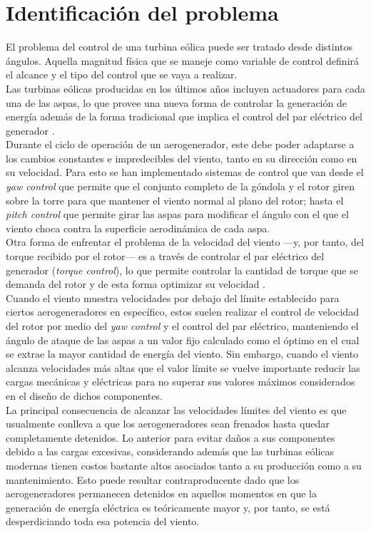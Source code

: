 \section{Identificación del problema}
{\parindent0pt
El problema del control de una turbina eólica puede ser tratado desde distintos ángulos. 
Aquella magnitud física que se maneje como variable de control definirá el alcance y el tipo 
del control que se vaya a realizar. 
\\

Las turbinas eólicas producidas en los últimos años incluyen actuadores para cada una de 
las aspas, lo que provee una nueva forma de controlar la generación de energía además de 
la forma tradicional que implica el control del par eléctrico del generador \cite{Laks2009}.
\\

Durante el ciclo de operación de un aerogenerador, este debe poder adaptarse a los cambios 
constantes e impredecibles del viento, tanto en su dirección como en su velocidad. Para esto 
se han implementado sistemas de control que van desde el \emph{yaw control} que permite que 
el conjunto completo de la góndola y el rotor giren sobre la torre para que mantener el 
viento normal al plano del rotor; hasta el \emph{pitch control} que permite girar las aspas 
para modificar el ángulo con el que el viento choca contra la superficie aerodinámica de cada aspa. 
\\

Otra forma de enfrentar el problema de la velocidad del viento —y, por tanto, del torque 
recibido por el rotor— es a través de controlar el par eléctrico del generador (\emph{torque control}), 
lo que permite controlar la cantidad de torque que se demanda del rotor y de esta forma 
optimizar su velocidad \cite{Johnson2004}.
\\

Cuando el viento muestra velocidades por debajo del límite establecido para ciertos 
aerogeneradores en específico, estos suelen realizar el control de velocidad del rotor 
por medio del \emph{yaw control} y el control del par eléctrico, manteniendo el ángulo 
de ataque de las aspas a un valor fijo calculado como el óptimo en el cual se extrae la 
mayor cantidad de energía del viento. Sin embargo, cuando el viento alcanza velocidades 
más altas que el valor límite se vuelve importante reducir las cargas mecánicas y 
eléctricas para no superar sus valores máximos considerados en el diseño de dichos componentes. 
\\

La principal consecuencia de alcanzar las velocidades límites del viento es que usualmente 
conlleva a que los aerogeneradores sean frenados hasta quedar completamente detenidos. 
Lo anterior para evitar daños a sus componentes debido a las cargas excesivas, considerando 
además que las turbinas eólicas modernas tienen costos bastante altos asociados tanto a 
su producción como a su mantenimiento. Esto puede resultar contraproducente dado que los 
aerogeneradores permanecen detenidos en aquellos momentos en que la generación de energía 
eléctrica es teóricamente mayor y, por tanto, se está desperdiciando toda esa potencia del viento.


}


